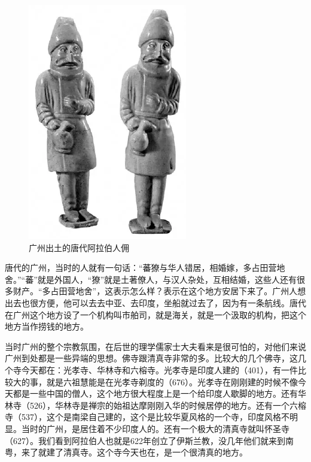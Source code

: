\begin{figure}
	\centering
	\includegraphics[width=\textwidth]{images/image-27}
	\caption{广州出土的唐代阿拉伯人佣}
\end{figure}

唐代的广州，当时的人就有一句话：“蕃獠与华人错居，相婚嫁，多占田营地舍。”“蕃”就是外国人，“獠”就是土著僚人，与汉人杂处，互相结婚，这些人还有很多财产。“多占田营地舍”，这表示怎么样？表示在这个地方安居下来了。广州人想出去也很方便，他可以去去中亚、去印度，坐船就过去了，因为有一条航线。唐代在广州这个地方设了一个机构叫市舶司，就是海关，就是一个汲取的机构，把这个地方当作捞钱的地方。

当时广州的整个宗教氛围，在后世的理学儒家士大夫看来是很可怕的，对他们来说广州到处都是一些异端的思想。佛寺跟清真寺非常的多。比较大的几个佛寺，这几个寺今天都在：光孝寺、华林寺和六榕寺。光孝寺是印度人建的（401），有一件比较大的事，就是六祖慧能是在光孝寺剃度的（676）。光孝寺在刚刚建的时候不像今天都是一些中国的僧人，这个地方很大程度上是一个给印度人歇脚的地方。还有华林寺（526），华林寺是禅宗的始祖达摩刚刚入华的时候居停的地方。还有一个六榕寺（537），这个是南梁自己建的，这个是比较华夏风格的一个寺，印度风格不明显。当时的广州，是居住着不少印度人的。还有一个极大的清真寺就叫怀圣寺（627）。我们看到阿拉伯人也就是622年创立了伊斯兰教，没几年他们就来到南粤，来了就建了清真寺。这个寺今天也在，是一个很清真的地方。

